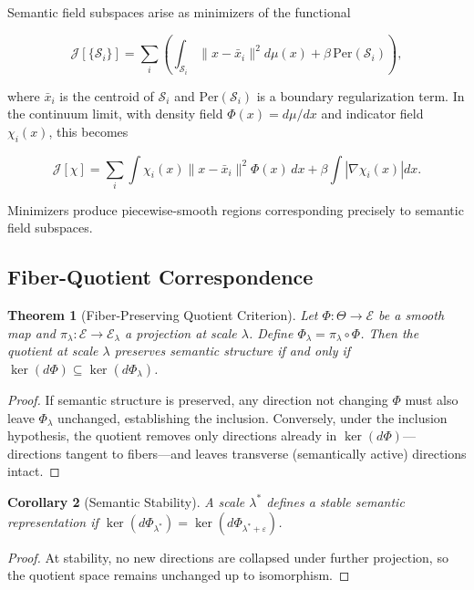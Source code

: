 \documentclass[11pt, twoside]{article}
\theoremstyle{plain}
\newtheorem{theorem}{Theorem}[section]
\newtheorem{corollary}[theorem]{Corollary}
\theoremstyle{definition}
\theoremstyle{remark}
\begin{document}
Semantic field subspaces arise as minimizers of the functional

\[
\mathcal{J}[\{\mathcal{S}_i\}] = \sum_i \left( \int_{\mathcal{S}_i} \|x - \bar{x}_i\|^2 d\mu(x) + \beta \, \mathrm{Per}(\mathcal{S}_i) \right),
\]

where $\bar{x}_i$ is the centroid of $\mathcal{S}_i$ and $\mathrm{Per}(\mathcal{S}_i)$ is a boundary regularization term. In the continuum limit, with density field $\Phi(x) = d\mu/dx$ and indicator field $\chi_i(x)$, this becomes

\[
\mathcal{J}[\chi] = \sum_i \int \chi_i(x) \|x - \bar{x}_i\|^2 \Phi(x)\, dx + \beta \int |\nabla \chi_i(x)| dx.
\]

Minimizers produce piecewise-smooth regions corresponding precisely to semantic field subspaces.

\subsection{Fiber-Quotient Correspondence}

\begin{theorem}[Fiber-Preserving Quotient Criterion]
Let $\Phi : \Theta \to \mathcal{E}$ be a smooth map and $\pi_\lambda : \mathcal{E} \to \mathcal{E}_\lambda$ a projection at scale $\lambda$. Define $\Phi_\lambda = \pi_\lambda \circ \Phi$. Then the quotient at scale $\lambda$ preserves semantic structure if and only if $\ker(d\Phi) \subseteq \ker(d\Phi_\lambda)$.
\end{theorem}

\begin{proof}
If semantic structure is preserved, any direction not changing $\Phi$ must also leave $\Phi_\lambda$ unchanged, establishing the inclusion. Conversely, under the inclusion hypothesis, the quotient removes only directions already in $\ker(d\Phi)$---directions tangent to fibers---and leaves transverse (semantically active) directions intact.
\end{proof}

\begin{corollary}[Semantic Stability]
A scale $\lambda^*$ defines a stable semantic representation if $\ker(d\Phi_{\lambda^*}) = \ker(d\Phi_{\lambda^* + \varepsilon})$.
\end{corollary}

\begin{proof}
At stability, no new directions are collapsed under further projection, so the quotient space remains unchanged up to isomorphism.
\end{proof}
\end{document}
